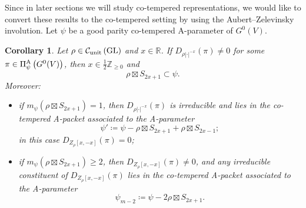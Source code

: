 \documentclass[11pt,letterpaper]{amsart}
\theoremstyle{plain}
\newcounter{theorem}[section]
\numberwithin{theorem}{section}
\numberwithin{equation}{subsection}
\newtheorem{Cor}[theorem]{Corollary}
\theoremstyle{remark}
\newcommand{\GL}{\operatorname{GL}}
\newcommand{\Z}{\mathbb{Z}}
\newcommand{\R}{\mathbb{R}}
\newcommand{\unit}{{\rm unit}}
\def\calC{\mathcal{C}}
\def\AP{\Pi^{\rm A}} %
\begin{document}
\vskip 5pt

Since in later sections we will study co-tempered representations, we would like to convert these results to the co-tempered setting by using the Aubert--Zelevinsky involution. Let $\psi$ be a good parity co-tempered A-parameter of $G^0(V)$.

\begin{Cor}\label{C:co-temperedAtobeLem.4.1NStDer}
Let $\rho\in\calC_{\unit}\left(\GL\right)$ and $x\in\R$. If $D_{\rho|\cdot|^{-x}}\left(\pi\right)\neq 0$ for some $\pi\in\AP_\psi\left(G^0(V)\right)$, then $x\in\frac{1}{2}\Z_{\geq0}$ and
\[
    \rho \boxtimes S_{2x+1} \subset \psi.
\]
Moreover:
\begin{itemize}
    \item if $m_\psi\left(\rho\boxtimes S_{2x+1}\right)=1$, then $D_{\rho|\cdot|^{-x}}\left(\pi\right)$ is irreducible and lies in the co-tempered A-packet associated to the A-parameter
    \[
        \psi' \coloneqq \psi - \rho \boxtimes S_{2x+1} + \rho \boxtimes S_{2x-1};
    \]
    in this case $D_{Z_\rho[x,-x]}\left(\pi\right)=0$;

\vskip 5pt

\item if $m_\psi\left(\rho\boxtimes S_{2x+1}\right)\geq 2$, then $D_{Z_\rho[x,-x]}\left(\pi\right)\neq 0$, and any irreducible constituent of $D_{Z_\rho[x,-x]}\left(\pi\right)$ lies in the co-tempered A-packet associated to the A-parameter
\[
    \psi_{m-2} \coloneqq \psi - 2\rho\boxtimes S_{2x+1}.
\]
\end{itemize} 
\end{Cor}

\vskip 5pt
\end{document}
